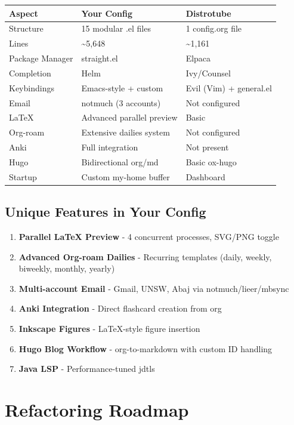 \documentclass[11pt]{article}
\begin{document}
\begin{center}
\begin{tabular}{lll}
Aspect & Your Config & Distrotube\\
\hline
Structure & 15 modular .el files & 1 config.org file\\
Lines & \textasciitilde{}5,648 & \textasciitilde{}1,161\\
Package Manager & straight.el & Elpaca\\
Completion & Helm & Ivy/Counsel\\
Keybindings & Emacs-style + custom & Evil (Vim) + general.el\\
Email & notmuch (3 accounts) & Not configured\\
\LaTeX{} & Advanced parallel preview & Basic\\
Org-roam & Extensive dailies system & Not configured\\
Anki & Full integration & Not present\\
Hugo & Bidirectional org/md & Basic ox-hugo\\
Startup & Custom my-home buffer & Dashboard\\
\end{tabular}
\end{center}
\subsection{Unique Features in Your Config}
\label{sec:org25531eb}

\begin{enumerate}
\item \textbf{Parallel \LaTeX{} Preview} - 4 concurrent processes, SVG/PNG toggle
\item \textbf{Advanced Org-roam Dailies} - Recurring templates (daily, weekly, biweekly, monthly, yearly)
\item \textbf{Multi-account Email} - Gmail, UNSW, Abaj via notmuch/lieer/mbsync
\item \textbf{Anki Integration} - Direct flashcard creation from org
\item \textbf{Inkscape Figures} - \LaTeX{}-style figure insertion
\item \textbf{Hugo Blog Workflow} - org-to-markdown with custom ID handling
\item \textbf{Java LSP} - Performance-tuned jdtls
\end{enumerate}
\section{Refactoring Roadmap}
\label{sec:org920cf4c}
\end{document}
